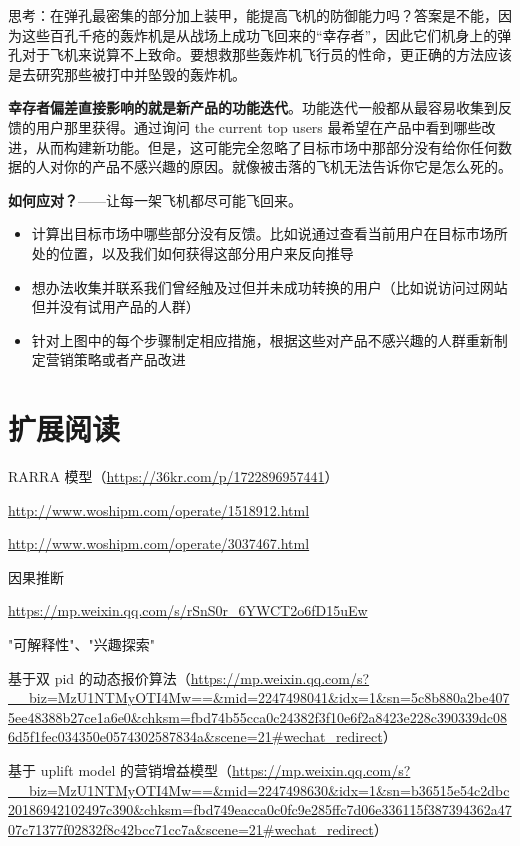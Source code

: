 \documentclass[12pt]{article}
\begin{document}
思考：在弹孔最密集的部分加上装甲，能提高飞机的防御能力吗？答案是不能，因为这些百孔千疮的轰炸机是从战场上成功飞回来的“幸存者”，因此它们机身上的弹孔对于飞机来说算不上致命。要想救那些轰炸机飞行员的性命，更正确的方法应该是去研究那些被打中并坠毁的轰炸机。

\textbf{幸存者偏差直接影响的就是新产品的功能迭代}。功能迭代一般都从最容易收集到反馈的用户那里获得。通过询问 the current top users 最希望在产品中看到哪些改进，从而构建新功能。但是，这可能完全忽略了目标市场中那部分没有给你任何数据的人对你的产品不感兴趣的原因。就像被击落的飞机无法告诉你它是怎么死的。

\textbf{如何应对？}——让每一架飞机都尽可能飞回来。
\begin{itemize}
\setlength{\itemsep}{0pt}
\setlength{\parsep}{0pt}
\setlength{\parskip}{0pt}
    \item 计算出目标市场中哪些部分没有反馈。比如说通过查看当前用户在目标市场所处的位置，以及我们如何获得这部分用户来反向推导

    \item 想办法收集并联系我们曾经触及过但并未成功转换的用户（比如说访问过网站但并没有试用产品的人群）

    \item 针对上图中的每个步骤制定相应措施，根据这些对产品不感兴趣的人群重新制定营销策略或者产品改进
\end{itemize}




\section{扩展阅读}
RARRA 模型（\url{https://36kr.com/p/1722896957441}）

\url{http://www.woshipm.com/operate/1518912.html}

\url{http://www.woshipm.com/operate/3037467.html}

因果推断

\url{https://mp.weixin.qq.com/s/rSnS0r_6YWCT2o6fD15uEw}

"可解释性"、"兴趣探索"

基于双 pid 的动态报价算法（\url{https://mp.weixin.qq.com/s?__biz=MzU1NTMyOTI4Mw==&mid=2247498041&idx=1&sn=5c8b880a2be4075ee48388b27ce1a6e0&chksm=fbd74b55cca0c24382f3f10e6f2a8423e228c390339dc086d5f1fec034350e0574302587834a&scene=21#wechat_redirect}）

基于 uplift model 的营销增益模型（\url{https://mp.weixin.qq.com/s?__biz=MzU1NTMyOTI4Mw==&mid=2247498630&idx=1&sn=b36515e54c2dbc20186942102497c390&chksm=fbd749eacca0c0fc9e285ffc7d06e336115f387394362a4707c71377f02832f8c42bcc71cc7a&scene=21#wechat_redirect}）



\end{document}
